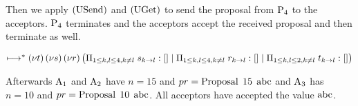 Then we apply $\RUsend$ and $\RUget$ to send the proposal from $\Proposer{4}$ to the acceptors.
$\Proposer{4}$ terminates and the acceptors accept the received proposal and then terminate as well.




$\mapstostar
\NuChannels \big (\InnerSessionQueues{s}
\Or \InnerSessionQueues{r}
\Or \OuterSessionQueues
\big )$

Afterwards $\Acceptor{1}$ and $\Acceptor{2}$ have $n = 15$ and $pr = \ProposalC{15}{\ABC}$ and $\Acceptor{3}$ has $n = 10$ and $pr = \ProposalC{10}{\ABC}$.
All acceptors have accepted the value $\ABC$.



